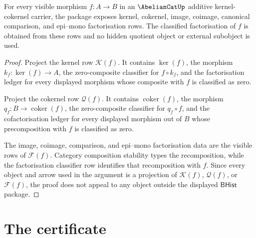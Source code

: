 \begin{theorem}
\label{thm:abeliancat-kernel-cokernel-factorization-obligation}
For every visible morphism $f:A\to B$ in an $\AbelianCatUp$ additive
kernel-cokernel carrier, the package exposes kernel, cokernel, image, coimage,
canonical comparison, and epi--mono factorisation rows. The classified
factorisation of $f$ is obtained from these rows and no hidden quotient object
or external subobject is used.
\end{theorem}
\begin{proof}
Project the kernel row $\mathcal K(f)$. It contains $\ker(f)$, the morphism
$k_f:\ker(f)\to A$, the zero-composite classifier for $f\circ k_f$, and the
factorisation ledger for every displayed morphism whose composite with $f$ is
classified as zero.

Project the cokernel row $\mathcal Q(f)$. It contains
$\operatorname{coker}(f)$, the morphism
$q_f:B\to\operatorname{coker}(f)$, the zero-composite classifier for
$q_f\circ f$, and the cofactorisation ledger for every displayed morphism out
of $B$ whose precomposition with $f$ is classified as zero.

The image, coimage, comparison, and epi--mono factorisation data are the
visible rows of $\mathcal F(f)$. Category composition stability types the
recomposition, while the factorisation classifier row identifies that
recomposition with $f$. Since every object and arrow used in the argument is a
projection of $\mathcal K(f)$, $\mathcal Q(f)$, or $\mathcal F(f)$, the proof
does not appeal to any object outside the displayed $\mathsf{BHist}$ package.
\end{proof}

\section{The certificate}
\label{sec:abeliancat-certificate}

